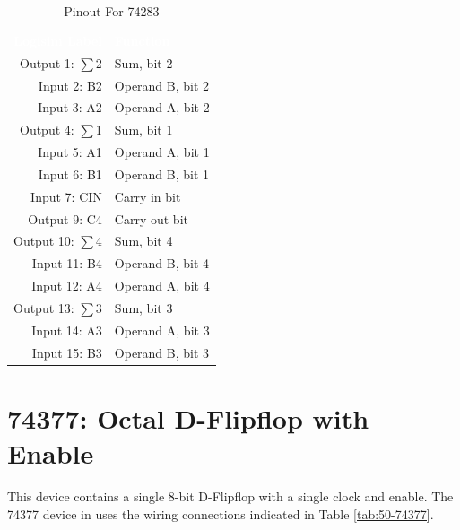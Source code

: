 \begin{table}[H]
	\sffamily
	\newcommand{\head}[1]{\textcolor{white}{\textbf{#1}}}		
	\begin{center}
		\begin{tabular}{rl} 
			\rowcolor{black!75}
			\head{Logisim Label} & \head{Function}  \\
			Output 1: $ \sum $2  & Sum, bit 2       \\
			Input 2: B2          & Operand B, bit 2 \\
			Input 3: A2          & Operand A, bit 2 \\
			Output 4: $ \sum $1  & Sum, bit 1       \\
			Input 5: A1          & Operand A, bit 1 \\
			Input 6: B1          & Operand B, bit 1 \\
			Input 7: CIN         & Carry in bit     \\
			Output 9: C4         & Carry out bit    \\
			Output 10: $ \sum $4 & Sum, bit 4       \\
			Input 11: B4         & Operand B, bit 4 \\
			Input 12: A4         & Operand A, bit 4 \\
			Output 13: $ \sum $3 & Sum, bit 3       \\
			Input 14: A3         & Operand A, bit 3 \\
			Input 15: B3         & Operand B, bit 3 \\
		\end{tabular}
	\end{center}
	\caption{Pinout For 74283}
	\label{tab:50-74283}
\end{table}

\section{74377: Octal D-Flipflop with Enable}

This device contains a single 8-bit D-Flipflop with a single clock and enable. The 74377 device in \LE uses the wiring connections indicated in Table \ref{tab:50-74377}.

